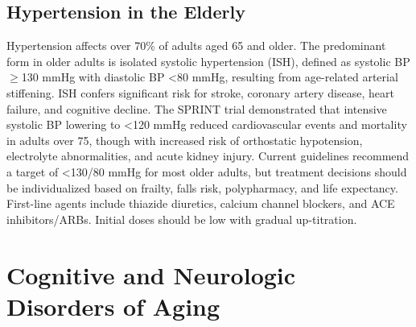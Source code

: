 \subsection{Hypertension in the Elderly}
\label{sec:Hypertension in the Elderly}

Hypertension affects over 70\% of adults aged 65 and older. The predominant form in older adults is isolated systolic hypertension (ISH), defined as systolic BP $\ge$130 mmHg with diastolic BP <80 mmHg, resulting from age-related arterial stiffening. ISH confers significant risk for stroke, coronary artery disease, heart failure, and cognitive decline. The SPRINT trial demonstrated that intensive systolic BP lowering to <120 mmHg reduced cardiovascular events and mortality in adults over 75, though with increased risk of orthostatic hypotension, electrolyte abnormalities, and acute kidney injury. Current guidelines recommend a target of <130/80 mmHg for most older adults, but treatment decisions should be individualized based on frailty, falls risk, polypharmacy, and life expectancy. First-line agents include thiazide diuretics, calcium channel blockers, and ACE inhibitors/ARBs. Initial doses should be low with gradual up-titration.

\section{Cognitive and Neurologic Disorders of Aging}








\label{sec:Cognitive and Neurologic Disorders of Aging}

